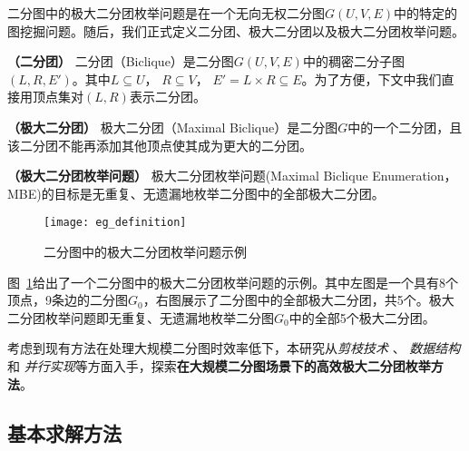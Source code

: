   二分图中的极大二分团枚举问题是在一个无向无权二分图$G(U,V,E)$中的特定的图挖掘问题。随后，我们正式定义二分团、极大二分团以及极大二分团枚举问题。

\begin{definition}
  \textbf{（二分团）} 二分团（Biclique）是二分图$G(U,V,E)$中的稠密二分子图$(L,R,E')$。其中$L\subseteq U$， $R\subseteq V$， $E' = L \times R \subseteq E$。为了方便，下文中我们直接用顶点集对$(L,R)$表示二分团。
\end{definition}

\begin{definition}
  \textbf{（极大二分团）} 极大二分团（Maximal Biclique）是二分图$G$中的一个二分团，且该二分团不能再添加其他顶点使其成为更大的二分团。
  \label{def:mb}
\end{definition}

\begin{definition}
  \textbf{（极大二分团枚举问题）} 极大二分团枚举问题(Maximal Biclique Enumeration， MBE)的目标是无重复、无遗漏地枚举二分图中的全部极大二分团。
\end{definition}

\begin{figure} [ht]
  \centering
  \texttt{[image: eg\_definition]}
  \vspace{0.1 in}
  \caption{二分图中的极大二分团枚举问题示例}
  \label{fig:eg_definition}
\end{figure}

\begin{example}
  图~\ref{fig:eg_definition}给出了一个二分图中的极大二分团枚举问题的示例。其中左图是一个具有8个顶点，9条边的二分图$G_0$，右图展示了二分图中的全部极大二分团，共5个。极大二分团枚举问题即无重复、无遗漏地枚举二分图$G_0$中的全部5个极大二分团。
  
\end{example}

考虑到现有方法在处理大规模二分图时效率低下，本研究从\emph{剪枝技术} 、 \emph{数据结构} 和 \emph{并行实现}等方面入手，探索\textbf{在大规模二分图场景下的高效极大二分团枚举方法}。





\subsection{基本求解方法}
\label{subsec:baseline}
  
